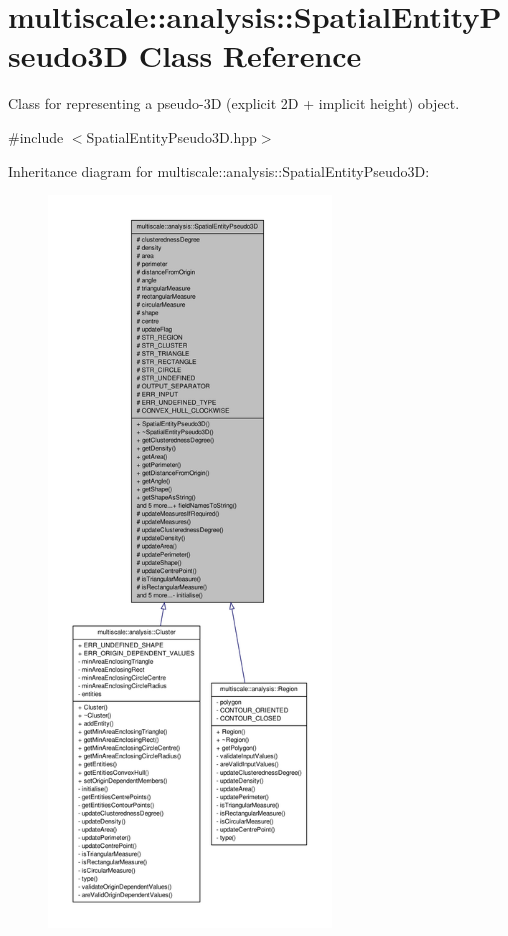 \hypertarget{classmultiscale_1_1analysis_1_1SpatialEntityPseudo3D}{\section{multiscale\-:\-:analysis\-:\-:\-Spatial\-Entity\-Pseudo3\-D \-Class \-Reference}
\label{classmultiscale_1_1analysis_1_1SpatialEntityPseudo3D}
}


\-Class for representing a pseudo-\/3\-D (explicit 2\-D + implicit height) object.  




{\ttfamily \#include $<$\-Spatial\-Entity\-Pseudo3\-D.\-hpp$>$}



\-Inheritance diagram for multiscale\-:\-:analysis\-:\-:\-Spatial\-Entity\-Pseudo3\-D\-:\nopagebreak
\begin{figure}[H]
\begin{center}
\leavevmode
\includegraphics[height=550pt]{classmultiscale_1_1analysis_1_1SpatialEntityPseudo3D__inherit__graph}
\end{center}
\end{figure}
